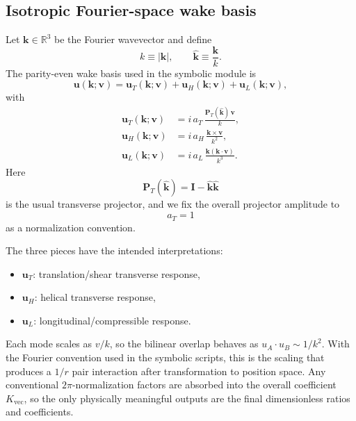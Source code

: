 \documentclass[11pt]{article}
\newcommand{\vct}{\mathbf v}
\newcommand{\Kvec}{K_{\mathrm{vec}}}
\begin{document}
\subsection{Isotropic Fourier-space wake basis}
\label{app:wake-basis}

Let \(\mathbf k\in\mathbb R^3\) be the Fourier wavevector and define
\begin{equation}
k\equiv |\mathbf k|,
\qquad
\hat{\mathbf k}\equiv \frac{\mathbf k}{k}.
\end{equation}
The parity-even wake basis used in the symbolic module is
\begin{equation}
\mathbf u(\mathbf k;\vct)
=
\mathbf u_T(\mathbf k;\vct)
+
\mathbf u_H(\mathbf k;\vct)
+
\mathbf u_L(\mathbf k;\vct),
\label{eq:app-wake-total}
\end{equation}
with
\begin{align}
\mathbf u_T(\mathbf k;\vct)
&=
i\,a_T\,\frac{\mathbf P_T(\hat{\mathbf k})\,\vct}{k},
\label{eq:app-uT}
\\[3pt]
\mathbf u_H(\mathbf k;\vct)
&=
i\,a_H\,\frac{\mathbf k\times \vct}{k^2},
\label{eq:app-uH}
\\[3pt]
\mathbf u_L(\mathbf k;\vct)
&=
i\,a_L\,\frac{\mathbf k(\mathbf k\!\cdot\!\vct)}{k^3}.
\label{eq:app-uL}
\end{align}
Here
\begin{equation}
\mathbf P_T(\hat{\mathbf k})=\mathbf I-\hat{\mathbf k}\hat{\mathbf k}
\label{eq:app-PT}
\end{equation}
is the usual transverse projector, and we fix the overall projector amplitude to
\begin{equation}
a_T=1
\label{eq:app-aT-one}
\end{equation}
as a normalization convention.

The three pieces have the intended interpretations:
\begin{itemize}[leftmargin=1.5em]
  \item \(\mathbf u_T\): translation/shear transverse response,
  \item \(\mathbf u_H\): helical transverse response,
  \item \(\mathbf u_L\): longitudinal/compressible response.
\end{itemize}
Each mode scales as \(v/k\), so the bilinear overlap behaves as \(u_A\!\cdot\!u_B\sim
1/k^2\). With the Fourier convention used in the symbolic scripts, this is the scaling
that produces a \(1/r\) pair interaction after transformation to position space. Any
conventional \(2\pi\)-normalization factors are absorbed into the overall coefficient
\(\Kvec\), so the only physically meaningful outputs are the final dimensionless ratios
and coefficients.
\end{document}
